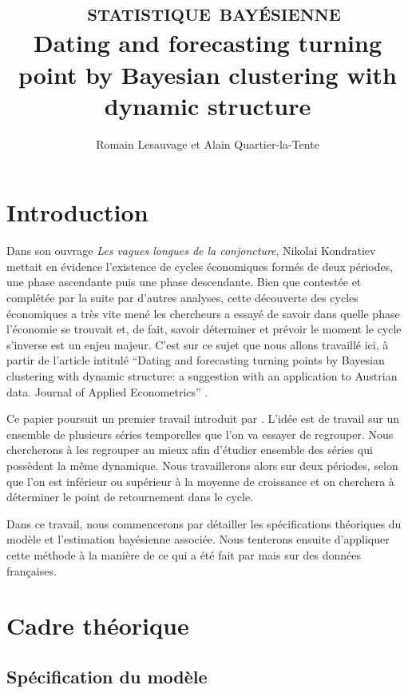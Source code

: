 \documentclass[10pt,french,french]{article}
\title{~\textsc{statistique bayésienne}\\
\hspace*{0.333em}Dating and forecasting turning point by Bayesian clustering with dynamic structure}
\author{Romain Lesauvage et Alain Quartier-la-Tente}
\date{}
\begin{document}
\maketitle




{
\hypersetup{linkcolor=black}
\setcounter{tocdepth}{2}
\tableofcontents
}
\newpage

\hypertarget{introduction}{%
\section{Introduction}\label{introduction}}

Dans son ouvrage \emph{Les vagues longues de la conjoncture}, Nikolai Kondratiev mettait en évidence l'existence de cycles économiques formés de deux périodes, une phase ascendante puis une phase descendante.
Bien que contestée et complétée par la suite par d'autres analyses, cette découverte des cycles économiques a très vite mené les chercheurs a essayé de savoir dans quelle phase l'économie se trouvait et, de fait, savoir déterminer et prévoir le moment le cycle s'inverse est un enjeu majeur.
C'est sur ce sujet que nous allons travaillé ici, à partir de l'article intitulé ``Dating and forecasting turning points by Bayesian clustering with dynamic structure: a suggestion with an application to Austrian data. Journal of Applied Econometrics'' \cite{Kaufmann}.

Ce papier poursuit un premier travail introduit par \cite{FruhwirthKaufmann}.
L'idée est de travail sur un ensemble de plusieurs séries temporelles que l'on va essayer de regrouper.
Nous chercherons à les regrouper au mieux afin d'étudier ensemble des séries qui possèdent la même dynamique.
Nous travaillerons alors sur deux périodes, selon que l'on est inférieur ou supérieur à la moyenne de croissance et on cherchera à déterminer le point de retournement dans le cycle.

Dans ce travail, nous commencerons par détailler les spécifications théoriques du modèle et l'estimation bayésienne associée.
Nous tenterons ensuite d'appliquer cette méthode à la manière de ce qui a été fait par \cite{Kaufmann} mais sur des données françaises.

\hypertarget{cadre-thuxe9orique}{%
\section{Cadre théorique}\label{cadre-thuxe9orique}}

\hypertarget{spuxe9cification-du-moduxe8le}{%
\subsection{Spécification du modèle}\label{spuxe9cification-du-moduxe8le}}
\end{document}
